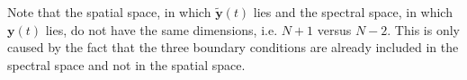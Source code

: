 Note that the spatial space, in which $\mathbf{\tilde{y}}(t)$ lies and the spectral space, in which $\mathbf{y}(t)$ lies, do not have the same dimensions, i.e. $N+1$ versus $N-2$. This is only caused by the fact that the three boundary conditions are already included in the spectral space and not in the spatial space.
%
%
